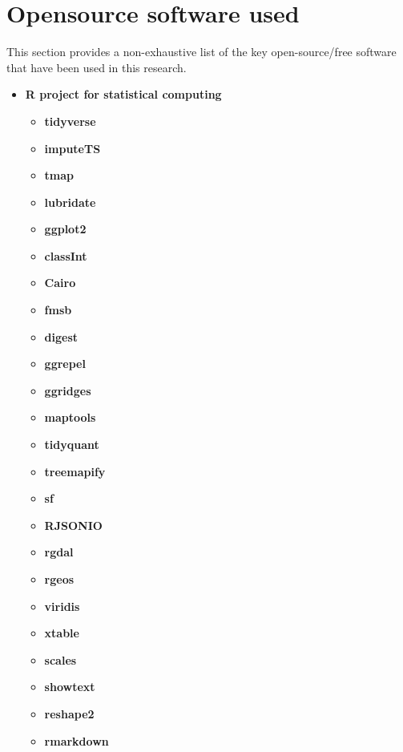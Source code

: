 \vspace{1em}
\inputminted{javascript}{analysis/data-collection/samplepacket.json}
\pagebreak

\section{Opensource software used}\label{appendix:software}

This section provides a non-exhaustive list of the key open-source/free software that have been used in this research.

\begin{itemize}
  \item \textbf{R project for statistical computing}
    \begin{itemize}
      \item \textbf{tidyverse}
      \item \textbf{imputeTS}
      \item \textbf{tmap}
      \item \textbf{lubridate}
      \item \textbf{ggplot2}
      \item \textbf{classInt}
      \item \textbf{Cairo}
      \item \textbf{fmsb}
      \item \textbf{digest}
      \item \textbf{ggrepel}
      \item \textbf{ggridges}
      \item \textbf{maptools}
      \item \textbf{tidyquant}
      \item \textbf{treemapify}
      \item \textbf{sf}
      \item \textbf{RJSONIO}
      \item \textbf{rgdal}
      \item \textbf{rgeos}
      \item \textbf{viridis}
      \item \textbf{xtable}
      \item \textbf{scales}
      \item \textbf{showtext}
      \item \textbf{reshape2}
      \item \textbf{rmarkdown}

\end{itemize}
\end{itemize}
